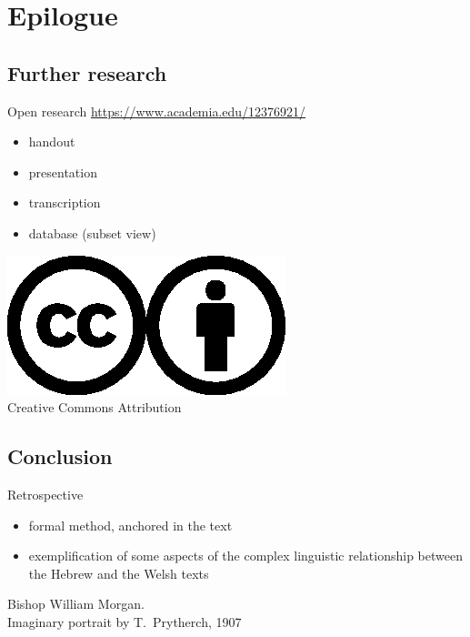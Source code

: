 \section{Epilogue}

\subsection{Further research}

\begin{frame}{Open research}
	\url{https://www.academia.edu/12376921/}

	\begin{itemize}
		\item handout
		\item presentation
		\item transcription
		\item database (subset view)
	\end{itemize}

	\vfill

	\begin{center}
		\includegraphics[width=2ex]{../cc.eps}\hspace{1ex}\includegraphics[width=2ex]{../by.eps}\\
		{\small Creative Commons Attribution}
	\end{center}
\end{frame}

\subsection{Conclusion}

\begin{frame}{Retrospective}
	\begin{itemize}
		\item formal method, anchored in the text
		\item exemplification of some aspects of the complex linguistic relationship between the Hebrew and the Welsh texts
	\end{itemize}
\end{frame}



\begin{frame}{}
	\begin{center}

		\vfill

		Bishop William Morgan.\\
		Imaginary portrait by T.\ Prytherch, 1907
	\end{center}
\end{frame}
